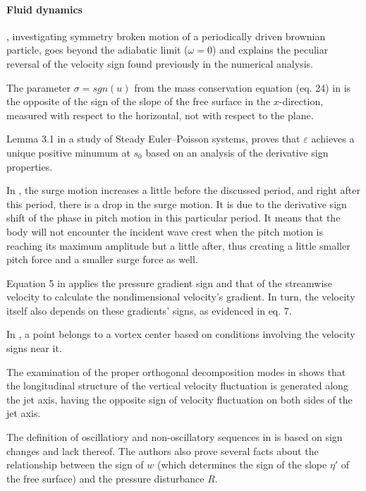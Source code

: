 \documentclass[11pt]{book}
\begin{document}
\paragraph{Fluid dynamics}

\cite{fistul2002symmetry}, investigating symmetry broken motion of a periodically driven brownian particle, goes beyond the adiabatic limit ($\omega=0$)
and explains the peculiar reversal of the velocity sign found previously
in the numerical analysis.

The parameter $\sigma=sgn\left(u\right)$ from the mass conservation
equation (eq. 24) in \cite{perazzo2003thin} is the opposite of the
sign of the slope of the free surface in the $x$-direction, measured
with respect to the horizontal, not with respect to the plane.

Lemma 3.1 in a study of Steady Euler–Poisson systems, \cite{jerome2009steady} proves that $\varepsilon$ achieves
a unique positive minumum at $s_{0}$ based on an analysis of the
derivative sign properties.

In \cite{pessoa2010experimental}, the surge motion increases a little
before the discussed period, and right after this period, there is
a drop in the surge motion. It is due to the derivative sign shift
of the phase in pitch motion in this particular period. It means that
the body will not encounter the incident wave crest when the pitch
motion is reaching its maximum amplitude but a little after, thus
creating a little smaller pitch force and a smaller surge force as
well.

Equation 5 in \cite{duprat2011wall} applies the pressure gradient
sign and that of the streamwise velocity to calculate the nondimensional
velocity's gradient. In turn, the velocity itself also depends on
these gradients' signs, as evidenced in eq. 7.

In \cite{holmen2012methods}, a point belongs to a vortex center based
on conditions involving the velocity signs near it.

The examination of the proper orthogonal decomposition modes in \cite{watanabe2015three} shows
that the longitudinal structure of the vertical velocity fluctuation
is generated along the jet axis, having the opposite sign of velocity
fluctuation on both sides of the jet axis.

The definition of oscillatiory and non-oscillatory sequences in \cite{wheeler2015solitary}
is based on sign changes and lack thereof. The authors also prove
several facts about the relationship between the sign of $w$ (which
determines the sign of the slope $\eta'$ of the free surface) and
the pressure disturbance $R$.
\end{document}
